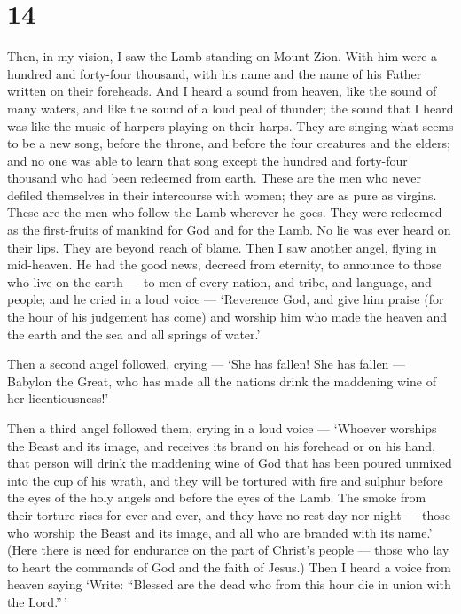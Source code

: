 \hypertarget{section-13}{%
\section{14}\label{section-13}}

 Then, in my vision, I saw the Lamb standing on Mount Zion.
With him were a hundred and forty-four thousand, with his name and the
name of his Father written on their foreheads.  And I heard
a sound from heaven, like the sound of many waters, and like the sound
of a loud peal of thunder; the sound that I heard was like the music of
harpers playing on their harps.  They are singing what seems
to be a new song, before the throne, and before the four creatures and
the elders; and no one was able to learn that song except the hundred
and forty-four thousand who had been redeemed from earth. 
These are the men who never defiled themselves in their intercourse with
women; they are as pure as virgins. These are the men who follow the
Lamb wherever he goes. They were redeemed as the first-fruits of mankind
for God and for the Lamb.  No lie was ever heard on their
lips. They are beyond reach of blame.  Then I saw another
angel, flying in mid-heaven. He had the good news, decreed from
eternity, to announce to those who live on the earth --- to men of every
nation, and tribe, and language, and people;  and he cried
in a loud voice --- `Reverence God, and give him praise (for the hour of
his judgement has come) and worship him who made the heaven and the
earth and the sea and all springs of water.'

 Then a second angel followed, crying --- `She has fallen!
She has fallen --- Babylon the Great, who has made all the nations drink
the maddening wine of her licentiousness!'

 Then a third angel followed them, crying in a loud voice
--- `Whoever worships the Beast and its image, and receives its brand on
his forehead or on his hand,  that person will drink the
maddening wine of God that has been poured unmixed into the cup of his
wrath, and they will be tortured with fire and sulphur before the eyes
of the holy angels and before the eyes of the Lamb.  The
smoke from their torture rises for ever and ever, and they have no rest
day nor night --- those who worship the Beast and its image, and all who
are branded with its name.'  (Here there is need for
endurance on the part of Christ's people --- those who lay to heart the
commands of God and the faith of Jesus.)  Then I heard a
voice from heaven saying `Write: ``Blessed are the dead who from this
hour die in union with the Lord.''\,'

